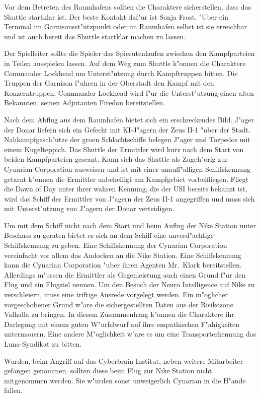 Vor dem Betreten des Raumhafens sollten die Charaktere sicherstellen, dass das Shuttle startklar ist. Der beste Kontakt daf"ur ist Sonja Frost. "Uber ein Terminal im Garnisonsst"utzpunkt oder im Raumhafen selbst ist sie erreichbar und ist auch bereit das Shuttle startklar machen zu lassen.

Der Spielleiter sollte die Spieler das Spie\3rutenlaufen zwischen den Kampfparteien in Teilen ausspielen lassen. Auf  dem Weg zum Shuttle k"onnen die Charaktere Commander Lockhead um Unterst"utzung durch Kampftruppen bitten. Die Truppen der Garnison f"uhren in der Oberstadt den Kampf mit den Konzerntruppen. Commander Lockhead wird f"ur die Unterst"utzung einen alten Bekannten, seinen Adjutanten Firedon bereitstellen.

Nach dem Abflug aus dem Raumhafen bietet sich ein erschreckendes Bild. J"ager der Donar liefern sich ein Gefecht mit KI-J"agern der Zeus II-1 "uber der Stadt. Nahkampfgesch"utze der gro\3en Schlachtschiffe belegen J"ager und Torpedos mit einem Kugelteppich. Das Shuttle der Ermittler wird kurz nach dem Start von beiden Kampfparteien gescant. Kann sich das 
Shuttle als Zugeh"orig zur Cynarian Corporation ausweisen und ist mit einer unauff"alligen Schiffskennung getarnt k"onnen 
die Ermittler unbehelligt am Kampfgebiet vorbeifliegen. Fliegt die Dawn of Day unter ihrer wahren Kennung, die der USI bereits bekannt ist, wird das Schiff der Ermittler von J"agern der Zeus II-1 angegriffen und muss sich mit Unterst"utzung von J"agern der Donar verteidigen.

Um mit dem Schiff nicht nach dem Start und beim Anflug der Nike Station unter Beschuss zu geraten bietet es sich an dem Schiff eine unverd"achtige Schiffskennung zu geben. Eine Schiffskennung der Cynarian Corporation vereinfacht vor allem das Andocken an die Nike Station. Eine Schiffskennung kann die Cynarian Corporation "uber ihren Agenten Mr.~Klark bereitstellen. Allerdings m"ussen die Ermittler als Gegenleistung auch einen Grund f"ur den Flug und ein Flugziel nennen. Um den Besuch der Neuro Intelligence auf Nike zu verschleiern, muss eine triftige Ausrede vorgelegt werden. Ein m"oglicher vorgeschobener Grund w"are die sichergestellten Daten aus der Risikozone Valhalla zu bringen. In diesem Zusammenhang k"onnen die Charaktere ihr Darlegung mit einem guten W"urfelwurf auf ihre empathischen F"ahigkeiten untermauern. Eine andere M"oglichkeit w"are es um eine Transporterkennung das Luna-Syndikat zu bitten.

\begin{remarks}
    Wurden, beim Angriff auf das Cyberbrain Institut, neben \ml{} weitere Mitarbeiter gefangen genommen, sollten diese beim Flug zur Nike Station nicht mitgenommen werden. Sie w"urden sonst unweigerlich Cynarian in die H"ande fallen.
\end{remarks}